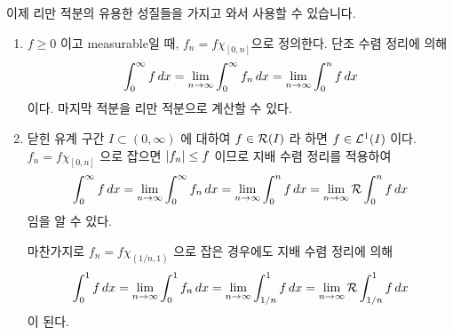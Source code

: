 이제 리만 적분의 유용한 성질들을 가지고 와서 사용할 수 있습니다.

\begin{enumerate}
    \item \(f \geq 0\) 이고 measurable일 때, \(f_n = f\chi_{[0, n]}\)으로 정의한다. 단조 수렴 정리에 의해
          \[
              \int_0^\infty f \,d{x} = \lim_{n \rightarrow \infty} \int_0^\infty f_n \,d{x} = \lim_{n \rightarrow \infty} \int_0^n f \,d{x}
          \]
          이다. 마지막 적분을 리만 적분으로 계산할 수 있다.

    \item 닫힌 유계 구간 \(I \subset (0, \infty)\) 에 대하여 \(f \in \mathcal{R}(I)\) 라 하면 \(f \in \mathcal{L}^{1}(I)\) 이다. \(f_n = f\chi_{[0, n]}\) 으로 잡으면 \(\left| f_n \right| \leq f\) 이므로 지배 수렴 정리를 적용하여
          \[
              \int_0^\infty f \,d{x} = \lim_{n \rightarrow \infty} \int_0^\infty f_n \,d{x} = \lim_{n \rightarrow \infty} \int_0^n f \,d{x} = \lim_{n \rightarrow \infty} \mathcal{R} \int_0^n f \,d{x}
          \]
          임을 알 수 있다.

          마찬가지로 \(f_n = f\chi_{(1/n, 1)}\) 으로 잡은 경우에도 지배 수렴 정리에 의해
          \[
              \int_0^1 f\,d{x} = \lim_{n \rightarrow \infty} \int_{0}^1 f_n \,d{x} = \lim_{n \rightarrow \infty}\int_{1/n}^1 f \,d{x} = \lim_{n \rightarrow \infty} \mathcal{R}\int_{1/n}^1 f \,d{x}
          \]
          이 된다.
\end{enumerate}

\pagebreak
